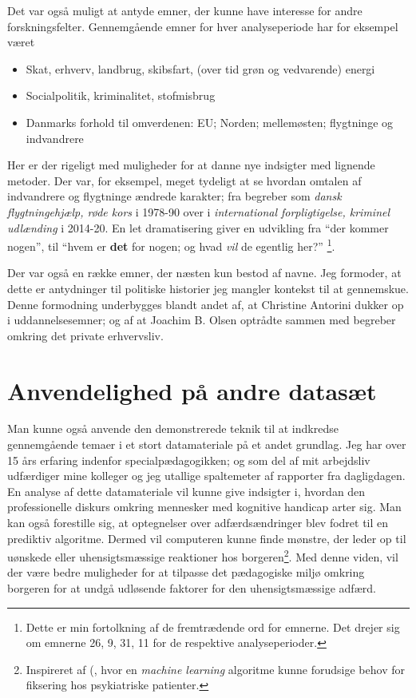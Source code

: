 Det var også muligt at antyde emner, der kunne have interesse for andre forskningsfelter.
Gennemgående emner for hver analyseperiode har for eksempel været
\begin{itemize}
  \item
    Skat, erhverv, landbrug, skibsfart, (over tid grøn og vedvarende) energi
  \item
    Socialpolitik, kriminalitet, stofmisbrug
  \item
    Danmarks forhold til omverdenen: EU; Norden; mellemøsten; flygtninge og indvandrere
\end{itemize}
Her er der rigeligt med muligheder for at danne nye indsigter med lignende metoder.
Der var, for eksempel, meget tydeligt at se hvordan omtalen af indvandrere og flygtninge ændrede karakter;
fra begreber som \textit{dansk flygtningehjælp, røde kors} i 1978-90 over i \textit{international forpligtigelse, kriminel udlænding} i 2014-20.
En let dramatisering giver en udvikling fra “der kommer nogen”, til “hvem er \textbf{det} for nogen; og hvad \textit{vil} de egentlig her?”
\footnote{Dette er min fortolkning af de fremtrædende ord for emnerne. Det drejer sig om emnerne 26, 9, 31, 11 for de respektive analyseperioder.}.

Der var også en række emner, der næsten kun bestod af navne.
Jeg formoder, at dette er antydninger til politiske historier jeg mangler kontekst til at gennemskue.
Denne formodning underbygges blandt andet af, at Christine Antorini dukker op i uddannelsesemner; og af at Joachim B. Olsen optrådte sammen med begreber omkring det private erhvervsliv.

\section{Anvendelighed på andre datasæt}
Man kunne også anvende den demonstrerede teknik til at indkredse gennemgående temaer i et stort datamateriale på et andet grundlag.
Jeg har over 15 års erfaring indenfor specialpædagogikken; og som del af mit arbejdsliv udfærdiger mine kolleger og jeg utallige spaltemeter af rapporter fra dagligdagen.
En analyse af dette datamateriale vil kunne give indsigter i, hvordan den professionelle diskurs omkring mennesker med kognitive handicap arter sig.
Man kan også forestille sig, at optegnelser over adfærdsændringer blev fodret til en prediktiv algoritme.
Dermed vil computeren kunne finde mønstre, der leder op til uønskede eller uhensigtsmæssige reaktioner hos borgeren\footnote{
Inspireret af \citeauthor{danielsenPredictingMechanicalRestraint2019} (\citeyear{danielsenPredictingMechanicalRestraint2019}, hvor en \textit{machine learning} algoritme kunne forudsige behov for fiksering hos psykiatriske patienter.}.
Med denne viden, vil der være bedre muligheder for at tilpasse det pædagogiske miljø omkring borgeren for at undgå udløsende faktorer for den uhensigtsmæssige adfærd.

